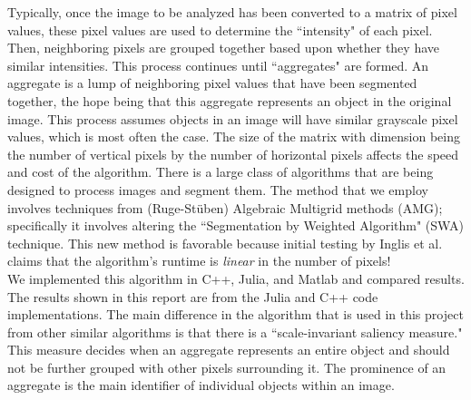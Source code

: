 \documentclass[12pt]{article}%
\begin{document}
Typically, once the image to be analyzed has been converted to a matrix of pixel values, these pixel values are used to determine the ``intensity" of each pixel.  Then, neighboring pixels are grouped together based upon whether they have similar intensities.  This process continues until ``aggregates" are formed.  An aggregate is a lump of neighboring pixel values that have been segmented together, the hope being that this aggregate represents an object in the original image. This process assumes objects in an image will have similar grayscale pixel values, which is most often the case. The size of the matrix with dimension being the number of vertical pixels by the number of horizontal pixels affects the speed and cost of the algorithm.  There is a large class of algorithms that are being designed to process images and segment them.  The method that we employ involves techniques from (Ruge-St\"uben) Algebraic Multigrid methods (AMG); specifically it involves altering the ``Segmentation by Weighted Algorithm" (SWA) technique.  This new method is favorable because initial testing by Inglis et al. claims that the algorithm's runtime is \emph{linear} in the number of pixels!\\

We implemented this algorithm in C++, Julia, and Matlab and compared results.  The results shown in this report are from the Julia and C++ code implementations.  The main difference in the algorithm that is used in this project from other similar algorithms is that there is a ``scale-invariant saliency measure." This measure decides when an aggregate represents an entire object and should not be further grouped with other pixels  surrounding it.  The prominence of an aggregate is the main identifier of individual objects within an image.
\end{document}
